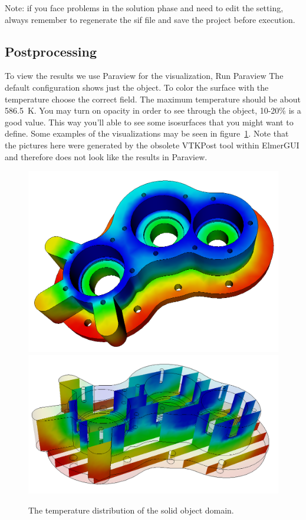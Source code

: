 Note: if you face problems in the solution phase and need to edit the setting, always remember to regenerate the
sif file and save the project before execution.


\subsection*{Postprocessing}

To view the results we use Paraview for the visualization,
\ttbegin
Run
  Paraview
\ttend
The default configuration shows just the object. To color the surface with the temperature choose the correct field.
The maximum temperature should be about 586.5~K.
You may turn on opacity in order to see through the object, 10-20\% is a good value.
This way you'll able to see some isosurfaces that you might want to define.
Some examples of the visualizations may be seen in figure~\ref{fg:vtkpost1}. Note that the pictures here
were generated by the obsolete VTKPost tool within ElmerGUI and therefore does not look like the
results in Paraview.

\begin{figure}
\begin{center}
\includegraphics[width=120mm]{tempdist} \\
\includegraphics[width=120mm]{tempdist2}
\caption{The temperature distribution of the solid object domain.}\label{fg:vtkpost1}
\end{center}
\end{figure}

\hfill
\mbox{}






